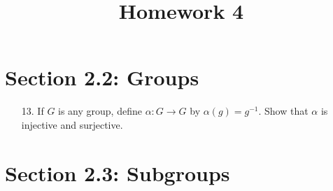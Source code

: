 \documentclass{article}
\begin{document}
\title{Homework 4}
\maketitle
\thispagestyle{fancy}

\section*{Section 2.2: Groups}
\begin{itemize}
	\item[13.] If $G$ is any group, define $\alpha:G\to G$ by $\alpha(g)=g^{-1}.$ Show that $\alpha$ is injective and surjective.
		
\end{itemize}

\section*{Section 2.3: Subgroups}
\end{document}
